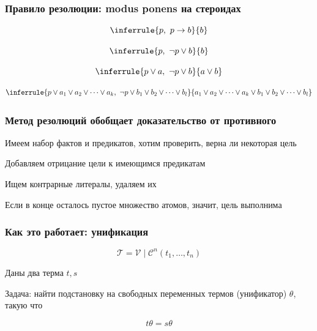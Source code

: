 \documentclass{beamer}
\begin{document}
\begin{frame}[fragile]
  \frametitle{Правило резолюции: modus ponens на стероидах}
  \[\inferrule{p, \ p \to b}{b}\]

  \[\inferrule{p, \ \neg p \vee b}{b}\]

  \[\inferrule{p \vee a, \ \neg p \vee b}{a \vee b}\]

  \[\inferrule{p \vee a_1 \vee a_2 \vee \dots \vee a_k, \ \neg p \vee b_1 \vee b_2 \vee \dots \vee b_l}{a_1 \vee a_2 \vee \dots \vee a_k \vee b_1 \vee b_2 \vee \dots \vee b_l}\]
\end{frame}

\begin{frame}[fragile]
  \frametitle{Метод резолюций обобщает доказательство от противного}

  \begin{center}
    Имеем набор фактов и предикатов, хотим проверить, верна ли некоторая цель
  \end{center}

  \begin{center}
    Добавляем отрицание цели к имеющимся предикатам
  \end{center}

  \begin{center}
    Ищем контрарные литералы, удаляем их
  \end{center}

  \begin{center}
    Если в конце осталось пустое множество атомов, значит, цель выполнима
  \end{center}
\end{frame}

\begin{frame}[fragile]
  \frametitle{Как это работает: унификация}

\[
  \mathcal{T} = \mathcal{V} \mid \mathcal{C}^n (t_1, \dots, t_n)
\]

\begin{center}
  Даны два терма $t, s$
\end{center}

\begin{center}
  Задача: найти подстановку на свободных переменных термов (унификатор) $\theta$, такую что
\end{center}

\[
  t \theta = s \theta
\]

\end{frame}
\end{document}
